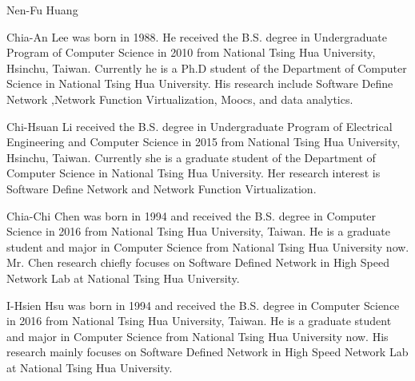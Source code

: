 \documentclass[journal]{IEEEtran}
\begin{document}



\begin{IEEEbiography}
{Nen-Fu Huang}
\end{IEEEbiography}

\begin{IEEEbiography}
{Chia-An Lee} was born in 1988. He received the B.S. degree in Undergraduate Program of Computer Science in 2010 from National Tsing Hua University, Hsinchu, Taiwan.
Currently he is a Ph.D student of the Department of Computer Science in National Tsing Hua University.
His research include Software Define Network ,Network Function Virtualization, Moocs, and data analytics.
\end{IEEEbiography}

\begin{IEEEbiography}
{Chi-Hsuan Li} received the B.S. degree in Undergraduate Program of Electrical Engineering and Computer Science in 2015 from National Tsing Hua University, Hsinchu, Taiwan. Currently she is a graduate student of the Department of Computer Science in National Tsing Hua University. Her research interest is Software Define Network and Network Function Virtualization.
\end{IEEEbiography}

\begin{IEEEbiography}
{Chia-Chi Chen} was born in 1994 and  received the B.S. degree in Computer Science in 2016 from National Tsing Hua University, Taiwan.
He is a graduate student and major in Computer Science from National Tsing Hua University now.
Mr. Chen research chiefly focuses on Software Defined Network in High Speed Network Lab at National Tsing Hua University.
\end{IEEEbiography}

\begin{IEEEbiography}
{I-Hsien Hsu} was born in 1994 and  received the B.S. degree in Computer Science in 2016 from National Tsing Hua University, Taiwan.
He is a graduate student and major in Computer Science from National Tsing Hua University now. His research mainly focuses on Software Defined Network in High Speed Network Lab at National Tsing Hua University.
\end{IEEEbiography}
\end{document}
